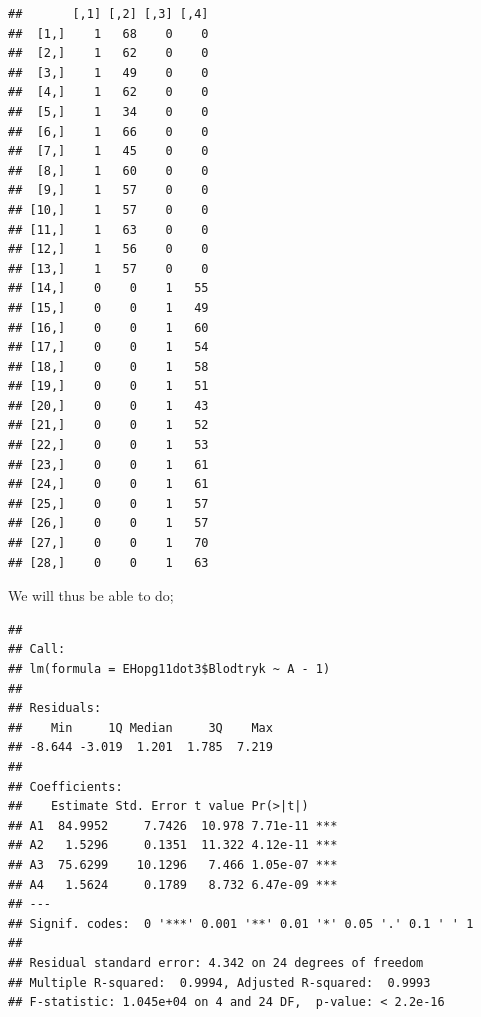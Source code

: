 \documentclass[
]{article}
\newenvironment{Shaded}{\begin{snugshade}}{\end{snugshade}}
\newcommand{\DataTypeTok}[1]{\textcolor[rgb]{0.13,0.29,0.53}{#1}}
\newcommand{\DecValTok}[1]{\textcolor[rgb]{0.00,0.00,0.81}{#1}}
\newcommand{\KeywordTok}[1]{\textcolor[rgb]{0.13,0.29,0.53}{\textbf{#1}}}
\newcommand{\NormalTok}[1]{#1}
\newcommand{\OperatorTok}[1]{\textcolor[rgb]{0.81,0.36,0.00}{\textbf{#1}}}
\newcommand{\StringTok}[1]{\textcolor[rgb]{0.31,0.60,0.02}{#1}}
\begin{document}
\begin{Shaded}
\end{Shaded}

\begin{verbatim}
##       [,1] [,2] [,3] [,4]
##  [1,]    1   68    0    0
##  [2,]    1   62    0    0
##  [3,]    1   49    0    0
##  [4,]    1   62    0    0
##  [5,]    1   34    0    0
##  [6,]    1   66    0    0
##  [7,]    1   45    0    0
##  [8,]    1   60    0    0
##  [9,]    1   57    0    0
## [10,]    1   57    0    0
## [11,]    1   63    0    0
## [12,]    1   56    0    0
## [13,]    1   57    0    0
## [14,]    0    0    1   55
## [15,]    0    0    1   49
## [16,]    0    0    1   60
## [17,]    0    0    1   54
## [18,]    0    0    1   58
## [19,]    0    0    1   51
## [20,]    0    0    1   43
## [21,]    0    0    1   52
## [22,]    0    0    1   53
## [23,]    0    0    1   61
## [24,]    0    0    1   61
## [25,]    0    0    1   57
## [26,]    0    0    1   57
## [27,]    0    0    1   70
## [28,]    0    0    1   63
\end{verbatim}

We will thus be able to do;

\begin{Shaded}
\end{Shaded}

\begin{verbatim}
## 
## Call:
## lm(formula = EHopg11dot3$Blodtryk ~ A - 1)
## 
## Residuals:
##    Min     1Q Median     3Q    Max 
## -8.644 -3.019  1.201  1.785  7.219 
## 
## Coefficients:
##    Estimate Std. Error t value Pr(>|t|)    
## A1  84.9952     7.7426  10.978 7.71e-11 ***
## A2   1.5296     0.1351  11.322 4.12e-11 ***
## A3  75.6299    10.1296   7.466 1.05e-07 ***
## A4   1.5624     0.1789   8.732 6.47e-09 ***
## ---
## Signif. codes:  0 '***' 0.001 '**' 0.01 '*' 0.05 '.' 0.1 ' ' 1
## 
## Residual standard error: 4.342 on 24 degrees of freedom
## Multiple R-squared:  0.9994, Adjusted R-squared:  0.9993 
## F-statistic: 1.045e+04 on 4 and 24 DF,  p-value: < 2.2e-16
\end{verbatim}
\end{document}
